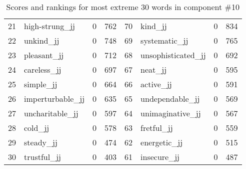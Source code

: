 \begin{table}[tbp]
\begin{tabular}{| rlr@{.}l | rlr@{.}l |}
    21 & high-strung\_jj & 0 & 762    &    70 & kind\_jj & 0 & 834 \\
    22 & unkind\_jj & 0 & 748    &    69 & systematic\_jj & 0 & 765 \\
    23 & pleasant\_jj & 0 & 712    &    68 & unsophisticated\_jj & 0 & 692 \\
    24 & careless\_jj & 0 & 697    &    67 & neat\_jj & 0 & 595 \\
    25 & simple\_jj & 0 & 664    &    66 & active\_jj & 0 & 591 \\
    26 & imperturbable\_jj & 0 & 635    &    65 & undependable\_jj & 0 & 569 \\
    27 & uncharitable\_jj & 0 & 597    &    64 & unimaginative\_jj & 0 & 567 \\
    28 & cold\_jj & 0 & 578    &    63 & fretful\_jj & 0 & 559 \\
    29 & steady\_jj & 0 & 474    &    62 & energetic\_jj & 0 & 515 \\
    30 & trustful\_jj & 0 & 403    &    61 & insecure\_jj & 0 & 487 \\
    \hline
    \end{tabular}
    \caption{Scores and rankings for most extreme 30 words in component \#10} 
\end{table}
\clearpage

